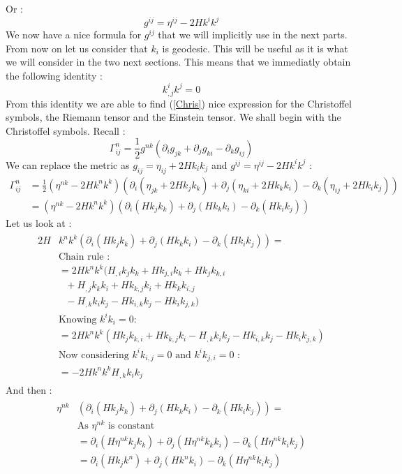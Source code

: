 \documentclass[a4paper,12pt]{article}
\theoremstyle{definition}
\begin{document}
Or :
\begin{equation}
	g^{ij}=\eta^{ij}-2Hk^ik^j
\end{equation}
We now have a nice formula for $g^{ij}$ that we will implicitly use in the next parts.
From now on let us consider that $k_i$ is geodesic. This will be useful as it is what we will consider in the two next sections.
This means that we immediatly obtain the following identity :
\begin{equation}
	k^i_{,j}k^j=0
\end{equation}
From this identity we are able to find (\ref{Chris}) nice expression for the Christoffel symbols, the Riemann tensor and the Einstein tensor.
We shall begin with the Christoffel symbols.
Recall :
\begin{equation}
	\Gamma^n_{ij}=\frac{1}{2}g^{nk}(\partial_i g_{jk}+\partial_j g_{ki}-\partial_k g_{ij})
\end{equation}
We can replace the metric as $g_{ij}=\eta_{ij}+2Hk_ik_j$ and $g^{ij}=\eta^{ij}-2Hk^ik^j$ :
\begin{align}
	\Gamma^n_{ij}&=\frac{1}{2}(\eta^{nk}-2Hk^nk^k)(\partial_i (\eta_{jk}+2Hk_jk_k)+\partial_j (\eta_{ki}+2Hk_kk_i)-\partial_k (\eta_{ij}+2Hk_ik_j))\\
	&=(\eta^{nk}-2Hk^nk^k)(\partial_i (Hk_jk_k)+\partial_j (Hk_kk_i)-\partial_k (Hk_ik_j))
\end{align}
Let us look at :
\begin{align}
\begin{split}
	2H&k^nk^k(\partial_i (Hk_jk_k)+\partial_j (Hk_kk_i)-\partial_k (Hk_ik_j)) =\\
	&\text{Chain rule :}\\
	&=2Hk^nk^k(H_{,i}k_jk_k+Hk_{j,i}k_k+Hk_jk_{k,i}\\&\text{ }+H_{,j}k_kk_i+Hk_{k,j}k_i+Hk_kk_{i,j}\\&\text{ }-H_{,k}k_ik_j-Hk_{i,k}k_j-Hk_ik_{j,k})\\
	&\text{Knowing } k^ik_i=0 :\\
	&=2Hk^nk^k(Hk_jk_{k,i}+Hk_{k,j}k_i-H_{,k}k_ik_j-Hk_{i,k}k_j-Hk_ik_{j,k})\\
	&\text{Now considering $k^ik_{i,j}=0$ and $k^ik_{j,i}=0$ :}\\
	&=-2Hk^nk^kH_{,k}k_ik_j
\end{split}
\end{align}
And then :
\begin{align}
\begin{split}
	\eta^{nk}&(\partial_i (Hk_jk_k)+\partial_j (Hk_kk_i)-\partial_k (Hk_ik_j))=\\
	&\text{As $\eta^{nk}$ is constant}\\
	&=\partial_i (H\eta^{nk}k_jk_k)+\partial_j (H\eta^{nk}k_kk_i)-\partial_k (H\eta^{nk}k_ik_j)\\
	&=\partial_i (Hk_jk^n)+\partial_j (Hk^nk_i)-\partial_k (H\eta^{nk}k_ik_j)
\end{split}
\end{align}
\end{document}
